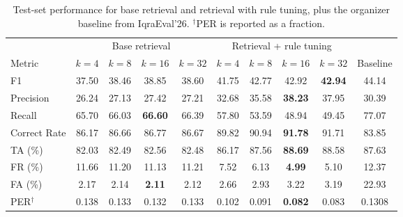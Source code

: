 \documentclass[11pt]{article}
\begin{document}
\begin{table}[t]
  \centering
  \small
  \setlength{\tabcolsep}{4pt}
  \begin{tabular}{lcccc|cccc|c}
    \hline
    & \multicolumn{4}{c|}{Base retrieval} & \multicolumn{4}{c|}{Retrieval + rule tuning} &  \\
    Metric & $k{=}4$ & $k{=}8$ & $k{=}16$ & $k{=}32$ & $k{=}4$ & $k{=}8$ & $k{=}16$ & $k{=}32$ & Baseline \\
    \hline
    F1 & 37.50 & 38.46 & 38.85 & 38.60 & 41.75 & 42.77 & 42.92 & \textbf{42.94} & 44.14 \\
    Precision & 26.24 & 27.13 & 27.42 & 27.21 & 32.68 & 35.58 & \textbf{38.23} & 37.95 & 30.39 \\
    Recall & 65.70 & 66.03 & \textbf{66.60} & 66.39 & 57.80 & 53.59 & 48.94 & 49.45 & 77.07 \\
    Correct Rate & 86.17 & 86.66 & 86.77 & 86.67 & 89.82 & 90.94 & \textbf{91.78} & 91.71 & 83.85 \\
    TA (\%) & 82.03 & 82.49 & 82.56 & 82.48 & 86.17 & 87.56 & \textbf{88.69} & 88.58 & 87.63 \\
    FR (\%) & 11.66 & 11.20 & 11.13 & 11.21 & 7.52 & 6.13 & \textbf{4.99} & 5.10 & 12.37 \\
    FA (\%) & 2.17 & 2.14 & \textbf{2.11} & 2.12 & 2.66 & 2.93 & 3.22 & 3.19 & 22.93 \\
    PER$^{\dagger}$ & 0.138 & 0.133 & 0.132 & 0.133 & 0.102 & 0.091 & \textbf{0.082} & 0.083 & 0.1308 \\
    \hline
  \end{tabular}
  \caption{Test-set performance for base retrieval and retrieval with rule tuning, plus the organizer baseline from IqraEval'26. $^{\dagger}$PER is reported as a fraction.}
  \label{tab:retrieval-k}
\end{table}
\end{document}
